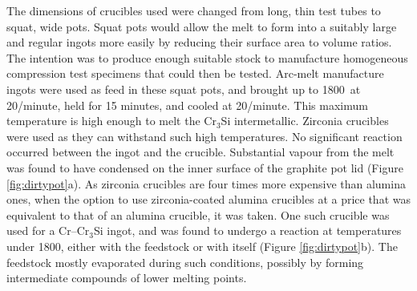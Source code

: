 The dimensions of crucibles used were changed from long, thin test tubes to squat, wide pots.  Squat pots would allow the melt to form into a suitably large and regular ingots more easily by reducing their surface area to volume ratios.  The intention was to produce enough suitable stock to manufacture homogeneous compression test specimens that could then be tested.  Arc-melt manufacture ingots were used as feed in these squat pots, and brought up to 1800\celsius\ at 20\celsius/minute, held for 15 minutes, and cooled at 20\celsius/minute.  This maximum temperature is high enough to melt the Cr$_3$Si intermetallic. Zirconia crucibles were used as they can withstand such high temperatures.  No significant reaction occurred between the ingot and the crucible.  Substantial vapour from the melt was found to have condensed on the inner surface of the graphite pot lid (Figure \ref{fig:dirtypot}a).  As zirconia crucibles are four times more expensive than alumina ones, when the option to use zirconia-coated alumina crucibles at a price that was equivalent to that of an alumina crucible, it was taken.  One such crucible was used for a Cr--Cr$_3$Si ingot, and was found to undergo a reaction  at temperatures under 1800\celsius, either with the feedstock or with itself (Figure \ref{fig:dirtypot}b).  The feedstock mostly evaporated during such conditions, possibly by forming intermediate compounds of lower melting points.

